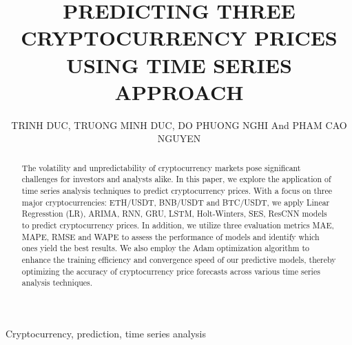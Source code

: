 \documentclass{ieeeojies}
\begin{document}
\title{PREDICTING THREE CRYPTOCURRENCY PRICES USING TIME SERIES APPROACH}

\author
{\uppercase{TRINH DUC},
\uppercase{TRUONG MINH DUC},
\uppercase {DO PHUONG NGHI}
\uppercase and {PHAM CAO NGUYEN}}

\address[1]{Faculty of Information Systems, University of Information Technology, (e-mail: 21521969@gm.uit.edu.vn)}
\address[2]{Faculty of Information Systems, University of Information Technology, (e-mail: 21521971@gm.uit.edu.vn)}
\address[3]{Faculty of Information Systems, University of Information Technology, (e-mail: 21522372@gm.uit.edu.vn)}
\address[3]{Faculty of Information Systems, University of Information Technology, (e-mail: 21522395@gm.uit.edu.vn)}

\begin{abstract}
The volatility and unpredictability of cryptocurrency markets pose significant challenges for investors and analysts alike. In this paper, we explore the application of time series analysis techniques to predict cryptocurrency prices. With a focus on three major cryptocurrencies: ETH/USDT, BNB/USDT and BTC/USDT, we apply Linear Regresstion (LR), ARIMA, RNN, GRU, LSTM, Holt-Winters, SES, ResCNN models to predict cryptocurrency prices. In addition, we utilize three evaluation metrics MAE, MAPE, RMSE and WAPE to assess the performance of models and identify which ones yield the best results. We also employ the Adam optimization algorithm to enhance the training efficiency and convergence speed of our predictive models, thereby optimizing the accuracy of cryptocurrency price forecasts across various time series analysis techniques.
\end{abstract}

\begin{keywords}
Cryptocurrency, prediction, time series analysis
\end{keywords}

\titlepgskip=-15pt

\maketitle
\end{document}
